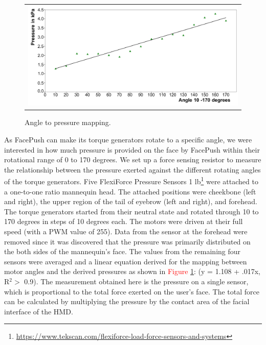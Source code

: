 \begin{figure}[h]
    \begin{center}
        \begin{tabular}{@{\hspace{0.1cm}}c}
            \includegraphics[width=1\linewidth]{figures/a2p}
        \end{tabular}
        \caption{Angle to pressure mapping.}
        \label{fig:angle_to_pressure}
    \end{center}
\end{figure}

As FacePush can make its torque generators rotate to a specific angle, we were interested in how much pressure is provided on the face by FacePush within their rotational range of 0 to 170 degrees. We set up a force sensing resistor to measure the relationship between the pressure exerted against the different rotating angles of the torque generators. Five FlexiForce Pressure Sensors 1 lb\footnote{\url{https://www.tekscan.com/flexiforce-load-force-sensors-and-systems}} were attached to a one-to-one ratio mannequin head. The attached positions were cheekbone (left and right), the upper region of the tail of eyebrow (left and right), and forehead. The torque generators started from their neutral state and rotated through 10 to 170 degrees in steps of 10 degrees each. The motors were driven at their full speed (with a PWM value of 255). Data from the sensor at the forehead were removed since it was discovered that the pressure was primarily distributed on the both sides of the mannequin's face. The values from the remaining four sensors were averaged and a linear equation derived for the mapping between motor angles and the derived pressures as shown in \textcolor{red}{Figure \ref{fig:angle_to_pressure}}: (y = 1.108 + .017x, R$^2 >$ 0.9). The measurement obtained here is the pressure on a single sensor, which is proportional to the total force exerted on the user's face. The total force can be calculated by multiplying the pressure by the contact area of the facial interface of the HMD.

